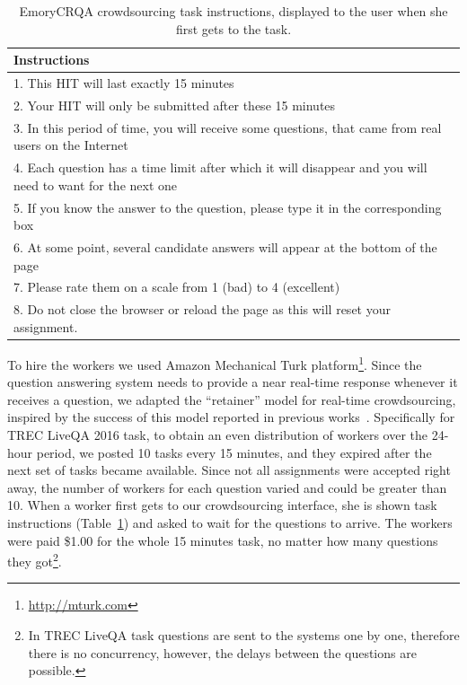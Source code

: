 \begin{table}[h]
\centering
\small
\begin{tabular}{p{13cm}}
\textbf{Instructions} \\
\hline
1. This HIT will last exactly 15 minutes\\
2. Your HIT will only be submitted after these 15 minutes\\
3. In this period of time, you will receive some questions, that came from real users on the Internet\\
4. Each question has a time limit after which it will disappear and you will need to want for the next one\\
5. If you know the answer to the question, please type it in the corresponding box\\
6. At some point, several candidate answers will appear at the bottom of the page\\
7. Please rate them on a scale from 1 (bad) to 4 (excellent)\\
8. Do not close the browser or reload the page as this will reset your assignment.\\
\end{tabular}
\caption{EmoryCRQA crowdsourcing task instructions, displayed to the user when she first gets to the task.}
\label{table:non-factoid:crowdsourcing:crqa:crowd_instructions}
\end{table}

To hire the workers we used Amazon Mechanical Turk platform\footnote{\href{url}{http://mturk.com}}.
Since the question answering system needs to provide a near real-time response whenever it receives a question, we adapted the ``retainer'' model for real-time crowdsourcing, inspired by the success of this model reported in previous works~\cite{bernstein2011crowds,bigham2010vizwiz}.
Specifically for TREC LiveQA 2016 task, to obtain an even distribution of workers over the 24-hour period, we posted 10 tasks every 15 minutes, and they expired after the next set of tasks became available.
Since not all assignments were accepted right away, the number of workers for each question varied and could be greater than 10.
When a worker first gets to our crowdsourcing interface, she is shown task instructions (Table~\ref{table:non-factoid:crowdsourcing:crqa:crowd_instructions}) and asked to wait for the questions to arrive.
The workers were paid \$1.00 for the whole 15 minutes task, no matter how many questions they got\footnote{In TREC LiveQA task questions are sent to the systems one by one, therefore there is no concurrency, however, the delays between the questions are possible.}.

